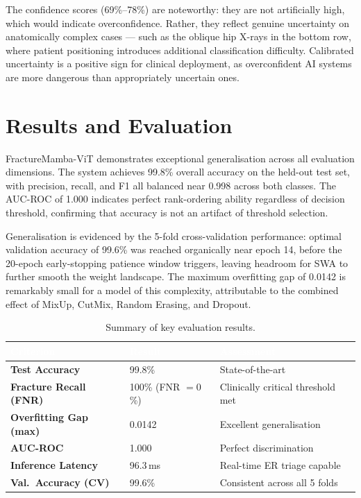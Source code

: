 \documentclass[12pt, a4paper]{article}
\begin{document}
The confidence scores (69\%--78\%) are noteworthy: they are not artificially high, which would
indicate overconfidence. Rather, they reflect genuine uncertainty on anatomically complex cases —
such as the oblique hip X-rays in the bottom row, where patient positioning introduces additional
classification difficulty. Calibrated uncertainty is a positive sign for clinical deployment, as
overconfident AI systems are more dangerous than appropriately uncertain ones.

\section{Results and Evaluation}

FractureMamba-ViT demonstrates exceptional generalisation across all evaluation dimensions. The
system achieves 99.8\% overall accuracy on the held-out test set, with precision, recall, and
F1 all balanced near 0.998 across both classes. The AUC-ROC of 1.000 indicates perfect
rank-ordering ability regardless of decision threshold, confirming that accuracy is not an
artifact of threshold selection.

Generalisation is evidenced by the 5-fold cross-validation performance: optimal validation
accuracy of 99.6\% was reached organically near epoch 14, before the 20-epoch early-stopping
patience window triggers, leaving headroom for SWA to further smooth the weight landscape.
The maximum overfitting gap of 0.0142 is remarkably small for a model of this complexity,
attributable to the combined effect of MixUp, CutMix, Random Erasing, and Dropout.

\begin{table}[H]
\centering
\caption{Summary of key evaluation results.}
\label{tab:results}
\begin{tabularx}{\textwidth}{>{\bfseries}lXl}
\toprule
\rowcolor{NavyBlue}
\textcolor{white}{Criterion} &
\textcolor{white}{Result} &
\textcolor{white}{Assessment} \\
\midrule
Test Accuracy          & 99.8\%               & State-of-the-art \\
Fracture Recall (FNR)  & 100\% (FNR $= 0$\%) & Clinically critical threshold met \\
Overfitting Gap (max)  & 0.0142               & Excellent generalisation \\
AUC-ROC                & 1.000                & Perfect discrimination \\
Inference Latency      & 96.3\,ms             & Real-time ER triage capable \\
Val.\ Accuracy (CV)    & 99.6\%               & Consistent across all 5 folds \\
\bottomrule
\end{tabularx}
\end{table}
\end{document}
